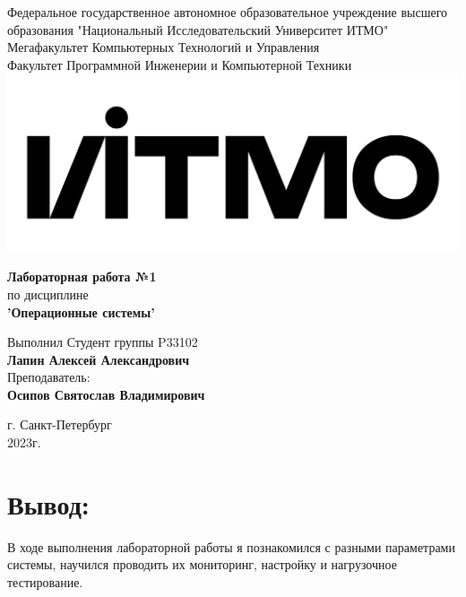 \documentclass[12pt,onecolumn]{article}
\begin{document}
\setcounter{tocdepth}{4}
\begin{center}
    Федеральное государственное автономное образовательное учреждение высшего образования "Национальный Исследовательский Университет ИТМО"\\ 
    Мегафакультет Компьютерных Технологий и Управления\\
    Факультет Программной Инженерии и Компьютерной Техники \\
    \includegraphics[scale=0.3]{image/itmo.jpg} %
\end{center}
\vspace{1cm}


\begin{center}
    \textbf{Лабораторная работа №1}\\
    по дисциплине\\
    \textbf{'Операционные системы'}\\
\end{center}

\vspace{2cm}

\begin{flushright}
  Выполнил Студент  группы P33102\\
  \textbf{Лапин Алексей Александрович}\\
  Преподаватель: \\
  \textbf{Осипов Святослав Владимирович}\\
\end{flushright}

\vspace{6cm}
\begin{center}
    г. Санкт-Петербург\\
    2023г.
\end{center}

\newpage
\tableofcontents
\newpage









\section{Вывод:}
В ходе выполнения лабораторной работы я познакомился с разными параметрами системы, научился проводить их мониторинг, настройку и нагрузочное тестирование.
\end{document}

